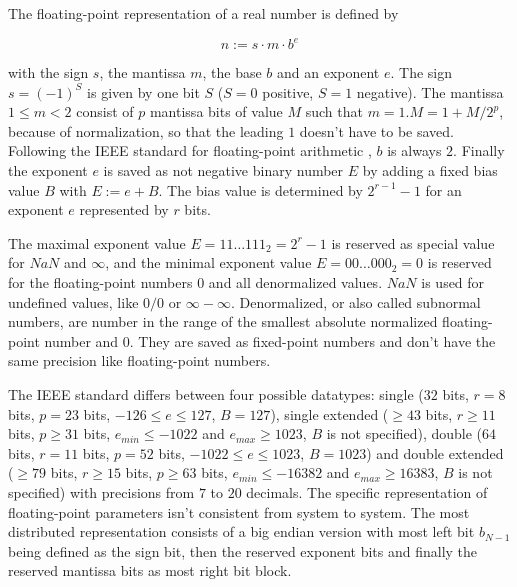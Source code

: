 \begin{definition}

    The floating-point representation of a real number is defined by 

    \begin{equation}
        n := s \cdot m \cdot b^{e}
    \label{eq:floatingpointarithmeticdef}
    \end{equation}

    with the sign $s$, the mantissa $m$, the base $b$ and an exponent $e$.
    The sign $s = \left(-1\right)^{S}$ is given by one bit $S$ ($S = 0$ positive, $S = 1$ negative). The mantissa $1 \leq m < 2$ consist of $p$ mantissa bits of value $M$ such that $m = 1.M = 1 + M/2^{p}$, because of normalization, so that the leading $1$ doesn't have to be saved. Following the IEEE standard for floating-point arithmetic \cite{8766229}, $b$ is always $2$. Finally the exponent $e$ is saved as not negative binary number $E$ by adding a fixed bias value $B$ with $E := e + B$. The bias value is determined by $2^{r-1} - 1$ for an exponent $e$ represented by $r$ bits.

\label{def:floatingpointrepresentation}
\end{definition}


The maximal exponent value $E=11\dots 111_{2}=2^{r}-1$ is reserved as special value for $NaN$ and $\infty$, and the minimal exponent value $E=00\dots 000_{2}=0$ is reserved for the floating-point numbers $0$ and all denormalized values. $NaN$ is used for undefined values, like $0/0$ or $\infty - \infty$. Denormalized, or also called subnormal numbers, are number in the range of the smallest absolute normalized floating-point number and $0$. They are saved as fixed-point numbers and don't have the same precision like floating-point numbers.

The IEEE standard \cite{8766229} differs between four possible datatypes: single ($32$ bits, $r = 8$ bits, $p = 23$ bits, $-126 \leq e \leq 127$, $B = 127$), single extended ($\geq 43$ bits, $r \geq 11$ bits, $p \geq 31$ bits, $e_{min} \leq -1022$ and $e_{max} \geq 1023$, $B$ is not specified), double ($64$ bits, $r = 11$ bits, $p = 52$ bits, $-1022 \leq e \leq 1023$, $B = 1023$) and double extended ($\geq 79$ bits, $r \geq 15$ bits, $p \geq 63$ bits, $e_{min} \leq -16382$ and $e_{max} \geq 16383$, $B$ is not specified) with precisions from $7$ to $20$ decimals. The specific representation of floating-point parameters isn't consistent from system to system. The most distributed representation consists of a big endian version with most left bit $b_{N-1}$ being defined as the sign bit, then the reserved exponent bits and finally the reserved mantissa bits as most right bit block. 


